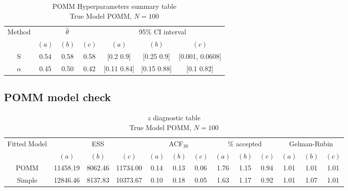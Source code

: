 \documentclass[11pt]{amsart}
\begin{document}
\begin{table}[htbp]
\centering
\caption*{
{\large POMM Hyperparameters summary table} \\ 
{\small True Model POMM, $N=100$}
} 
\begin{tabular}{ccccccc}
\toprule
\multirow{2}{*}{Method} & \multicolumn{3}{c}{
$\hat{\theta}$} & \multicolumn{3}{c}{
95$\%$ CI interval}  \\
\cmidrule(lr){2-4} \cmidrule(lr){5-7} 
& $(a)$ & $(b)$ & $(c)$ & $(a)$ & $(b)$ & $(c)$  \\
\midrule
S  &0.54 & 0.58 & 0.58 & [0.2	0.9] & [0.25	0.9] & [0.001,	0.0608]   \\
$\alpha$ & 0.45& 0.50& 0.42 & [0.11	0.84] & [0.15	0.88] & [0.1	0.82] \\
\bottomrule
\end{tabular}
\label{table:simulations_from_simple}
\end{table}


\subsection{POMM model check}



\begin{table}[htbp]
\centering
\caption*{
{\large $z$ diagnostic table} \\ 
{\small True Model POMM, $N=100$}
} 
\begin{tabular}{ccccccccccccc}
\toprule
\multirow{2}{*}{Fitted Model} & \multicolumn{3}{c}{ESS} & \multicolumn{3}{c}{
ACF$_{30}$} & \multicolumn{3}{c}{$\%$ accepted} & \multicolumn{3}{c}{Gelman-Rubin}\\
\cmidrule(lr){2-4} \cmidrule(lr){5-7} \cmidrule(lr){8-10} \cmidrule(lr){11-13} 
& $(a)$ & $(b)$ & $(c)$ & $(a)$ & $(b)$ & $(c)$ & $(a)$ & $(b)$ & $(c)$ & $(a)$ & $(b)$ & $(c)$ \\
\midrule
POMM &11458.19 & 8062.46 & 11734.00 & 0.14 & 0.13 & 0.06 & 1.76 & 1.15 & 0.94 & 1.01 & 1.01 & 1.01  \\
Simple &12846.46 & 8137.83 & 10373.67 & 0.10 & 0.18 & 0.05 & 1.63 & 1.17 & 0.92 & 1.01 & 1.07 & 1.01    \\
\bottomrule
\end{tabular}
\label{table:simulations_from_simple}
\end{table}
\end{document}
